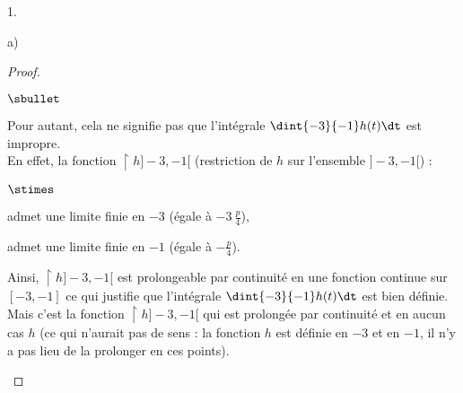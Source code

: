 \begin{noliste}{1.}
\begin{noliste}{a)}
\begin{proof}
\begin{remark}
\begin{noliste}{$\sbullet$}
        \item Pour autant, cela ne signifie pas que l'intégrale
          $\dint{-3}{-1} h(t) \dt$ est impropre.\\
          En effet, la fonction $\restriction{h}{]-3, -1[}$
          (restriction de $h$ sur l'ensemble $]-3, -1[$) :
          \begin{noliste}{$\stimes$}
          \item admet une limite finie en $-3$ (égale à $-3 \
            \frac{p}{4}$),
          \item admet une limite finie en $-1$ (égale à $-
            \frac{p}{4}$).
          \end{noliste}
          Ainsi, $\restriction{h}{]-3, -1[}$ est prolongeable par
          continuité en une fonction continue sur $[-3, -1]$ ce qui
          justifie que l'intégrale $\dint{-3}{-1} h(t) \dt$ est bien
          définie. \\
          Mais c'est la fonction $\restriction{h}{]-3, -1[}$ qui est
          prolongée par continuité et en aucun cas $h$ (ce qui
          n'aurait pas de sens : la fonction $h$ est définie en $-3$
          et en $-1$, il n'y a pas lieu de la prolonger en ces
          points).
          

\end{noliste}
\end{remark}
\end{proof}
\end{noliste}
\end{noliste}

